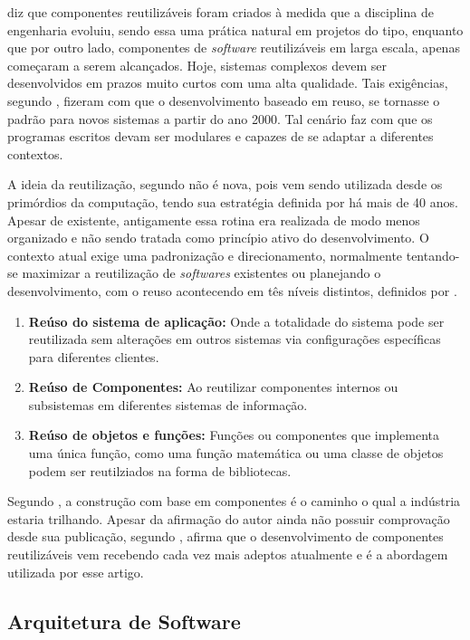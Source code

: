 \cite{pressman2011} diz que componentes reutilizáveis foram criados à medida que a disciplina de engenharia evoluiu, sendo essa uma prática natural em projetos do tipo, enquanto que por outro lado, componentes de \textit{software} reutilizáveis em larga escala, apenas começaram a serem alcançados. Hoje, sistemas complexos devem ser desenvolvidos em prazos muito curtos com uma alta qualidade. Tais exigências, segundo \cite{sommer07}, fizeram com que o desenvolvimento baseado em reuso, se tornasse o padrão para novos sistemas a partir do ano 2000. Tal cenário faz com que os programas escritos devam ser modulares e capazes de se adaptar a diferentes contextos.

A ideia da reutilização, segundo \cite{pressman2011} não é nova, pois vem sendo utilizada desde os primórdios da computação, tendo sua estratégia definida por \cite{unixPhilosophy} há mais de 40 anos. Apesar de existente, antigamente essa rotina era realizada de modo menos organizado e não sendo tratada como princípio ativo do desenvolvimento. O contexto atual exige uma padronização e direcionamento, normalmente tentando-se maximizar a reutilização de \textit{softwares} existentes ou planejando o desenvolvimento, com o reuso acontecendo em tês níveis distintos, definidos por \cite{sommer07}.

\begin{enumerate}
	\item \textbf{Reúso do sistema de aplicação:} Onde a totalidade do sistema pode ser reutilizada sem alterações em outros sistemas via configurações específicas para diferentes clientes.
	\item \textbf{Reúso de Componentes:} Ao reutilizar componentes internos ou subsistemas em diferentes sistemas de informação.
	\item \textbf{Reúso de objetos e funções:} Funções ou componentes que implementa uma única função, como uma função matemática ou uma classe de objetos  podem ser reutilziados na forma de bibliotecas. 
\end{enumerate}

Segundo \cite{pressman2011}, a construção com base em componentes é o caminho o qual a indústria estaria trilhando. Apesar da afirmação do autor ainda não possuir comprovação desde sua publicação, segundo \cite{28dbc}, \cite{ngConfComponents} afirma que o desenvolvimento de componentes reutilizáveis vem recebendo cada vez mais adeptos atualmente e é a abordagem utilizada por esse artigo.

\subsection{\esp Arquitetura de Software}

